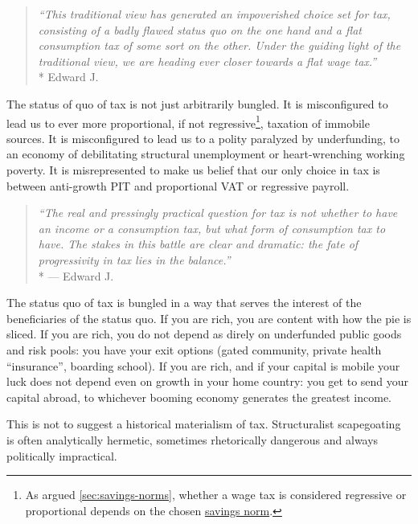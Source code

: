 \begin{quote}
	\emph{``This traditional view has generated an impoverished choice set for tax, consisting of a badly flawed status quo on the one hand and a flat consumption tax of some sort on the other.
	Under the guiding light of the traditional view, we are heading ever closer towards a flat wage tax.''}
	\\*
	Edward J.\ \citet[812]{McCaffery2005}
\end{quote}

The status of quo of tax is not just arbitrarily bungled.
It is misconfigured to lead us to ever more proportional, if not regressive\footnote{As argued \autoref{sec:savings-norms}, whether a wage tax is considered regressive or proportional depends on the chosen \hyperref[sec:savings-norms]{savings norm}.}, taxation of immobile sources.
It is misconfigured to lead us to a polity paralyzed by underfunding, to an economy of debilitating structural unemployment or heart-wrenching working poverty.
It is misrepresented to make us belief that our only choice in tax is between anti-growth PIT and proportional VAT or regressive payroll.

\begin{quote}
	\emph{``The real and pressingly practical question for tax is not whether to have an income or a consumption tax, but what form of consumption tax to have.
	The stakes in this battle are clear and dramatic:
	the fate of progressivity in tax lies in the balance.''}
	\\*
	--- Edward J.\ \citet[817]{McCaffery2005}
\end{quote}

The status quo of tax is bungled in a way that serves the interest of the beneficiaries of the status quo.
If you are rich, you are content with how the pie is sliced.
If you are rich, you do not depend as direly on underfunded public goods and risk pools:
you have your exit options (gated community, private health ``insurance'', boarding school).
If you are rich, and if your capital is mobile your luck does not depend even on growth in your home country:
you get to send your capital abroad, to whichever booming economy generates the greatest income.

This is not to suggest a historical materialism of tax.
Structuralist scapegoating is often analytically hermetic, sometimes rhetorically dangerous and always politically impractical.

